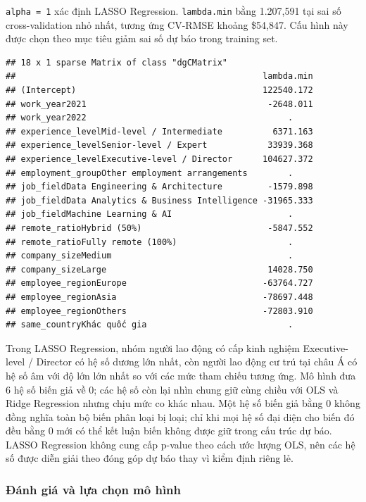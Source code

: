 \texttt{alpha\ =\ 1} xác định LASSO Regression. \texttt{lambda.min} bằng
1.207,591 tại sai số cross-validation nhỏ nhất, tương ứng CV-RMSE khoảng
\$54,847. Cấu hình này được chọn theo mục tiêu giảm sai số dự báo trong
training set.

\begin{verbatim}
## 18 x 1 sparse Matrix of class "dgCMatrix"
##                                                 lambda.min
## (Intercept)                                     122540.172
## work_year2021                                    -2648.011
## work_year2022                                        .    
## experience_levelMid-level / Intermediate          6371.163
## experience_levelSenior-level / Expert            33939.368
## experience_levelExecutive-level / Director      104627.372
## employment_groupOther employment arrangements        .    
## job_fieldData Engineering & Architecture         -1579.898
## job_fieldData Analytics & Business Intelligence -31965.333
## job_fieldMachine Learning & AI                       .    
## remote_ratioHybrid (50%)                         -5847.552
## remote_ratioFully remote (100%)                      .    
## company_sizeMedium                                   .    
## company_sizeLarge                                14028.750
## employee_regionEurope                           -63764.727
## employee_regionAsia                             -78697.448
## employee_regionOthers                           -72803.910
## same_countryKhác quốc gia                            .
\end{verbatim}

Trong LASSO Regression, nhóm người lao động có cấp kinh nghiệm
Executive-level / Director có hệ số dương lớn nhất, còn người lao động
cư trú tại châu Á có hệ số âm với độ lớn lớn nhất so với các mức tham
chiếu tương ứng. Mô hình đưa 6 hệ số biến giả về 0; các hệ số còn lại
nhìn chung giữ cùng chiều với OLS và Ridge Regression nhưng chịu mức co
khác nhau. Một hệ số biến giả bằng 0 không đồng nghĩa toàn bộ biến phân
loại bị loại; chỉ khi mọi hệ số đại diện cho biến đó đều bằng 0 mới có
thể kết luận biến không được giữ trong cấu trúc dự báo. LASSO Regression
không cung cấp p-value theo cách ước lượng OLS, nên các hệ số được diễn
giải theo đóng góp dự báo thay vì kiểm định riêng lẻ.

\subsubsection{Đánh giá và lựa chọn mô
hình}\label{nghi:ux111uxe1nh-giuxe1-vuxe0-lux1ef1a-chux1ecdn-muxf4-huxecnh}

